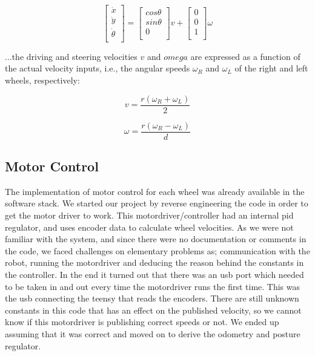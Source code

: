 \documentclass[a4paper,10pt]{article}
\begin{document}
\begin{equation}
	\begin{bmatrix}
	\dot{x}\\ 
	\dot{y}\\
	\dot{\theta}\\  
	\end{bmatrix}
	=
	\begin{bmatrix}
	cos\theta\\ 
	sin\theta\\
	0\\  
	\end{bmatrix}v
	+
	\begin{bmatrix}
	0\\ 
	0\\
	1\\  
	\end{bmatrix}\omega
\end{equation}


...the driving and steering velocities $v$ and $omega$ are expressed as a function of the actual velocity inputs, i.e., the angular speeds $\omega_{R}$ and $\omega_{L}$ of the right and left wheels, respectively:

		\begin{equation}
			v=\frac{r(\omega_R +\omega_L)}{2}
		\end{equation}

		\begin{equation}
			\omega=\frac{r(\omega_R -\omega_L)}{d}
		\end{equation}


\subsection{Motor Control}
	The implementation of motor control for each wheel was already available in the software stack. We started our project by reverse engineering the code in order to get the motor driver to work.
This motordriver/controller had an internal pid regulator, and uses encoder data to calculate wheel velocities.
	As we were not familiar with the system, and since there were no documentation or comments in the code, we faced challenges on elementary problems as; communication with the robot, running the motordriver and deducing the reason behind the constants in the controller.
In the end it turned out that there was an usb port which needed to be taken in and out every time the motordriver runs the first time. This was the usb connecting the teensy that reads the encoders. There are still unknown constants in this code that has an effect on the published velocity, so we cannot know if this motordriver is publishing correct speeds or not. We ended up assuming that it was correct and moved on to derive the odometry and posture regulator.
	
\end{document}
